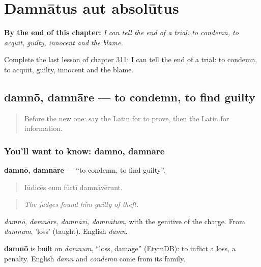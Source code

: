 
\chapter{Damnātus aut absolūtus}
\label{ch:la-damnatus-aut-absolutus}

\begin{chapteropening}
\textbf{By the end of this chapter:} \emph{I can tell the end of a trial: to condemn, to acquit, guilty, innocent and the blame.}

Complete the last lesson of chapter 311: I can tell the end of a trial: to condemn, to acquit, guilty, innocent and the blame.
\end{chapteropening}

\section[damnō, damnāre]{damnō, damnāre — to condemn, to find guilty}

\label{lesson:LA-C311-damno}



\begin{quote}
Before the new one: say the Latin for to prove, then the Latin for information.
\end{quote}

\subsection*{You'll want to know: damnō, damnāre}
\textbf{damnō, damnāre} — \textquotedblleft{}to condemn, to find guilty\textquotedblright{}.

\begin{quote}
Iūdicēs eum fūrtī damnāvērunt.
\end{quote}

\begin{quote}
\emph{The judges found him guilty of theft.}
\end{quote}

\emph{damnō, damnāre, damnāvī, damnātum}, with the genitive of the charge. From \emph{damnum}, 'loss' (taught). English \emph{damn}.

\begin{cousinweb}
\textbf{damnō} is built on \emph{damnum}, \textquotedblleft{}loss, damage\textquotedblright{} (EtymDB): to inflict a loss, a penalty. English \emph{damn} and \emph{condemn} come from its family.
\end{cousinweb}

